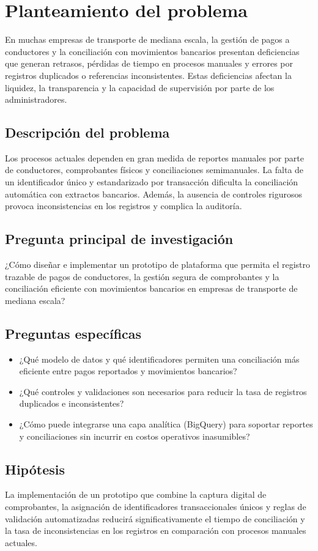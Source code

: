 \section{Planteamiento del problema}

En muchas empresas de transporte de mediana escala, la gestión de pagos a conductores y la conciliación con movimientos bancarios presentan deficiencias que generan retrasos, pérdidas de tiempo en procesos manuales y errores por registros duplicados o referencias inconsistentes. Estas deficiencias afectan la liquidez, la transparencia y la capacidad de supervisión por parte de los administradores.

\subsection{Descripción del problema}
Los procesos actuales dependen en gran medida de reportes manuales por parte de conductores, comprobantes físicos y conciliaciones semimanuales. La falta de un identificador único y estandarizado por transacción dificulta la conciliación automática con extractos bancarios. Además, la ausencia de controles rigurosos provoca inconsistencias en los registros y complica la auditoría.

\subsection{Pregunta principal de investigación}
¿Cómo diseñar e implementar un prototipo de plataforma que permita el registro trazable de pagos de conductores, la gestión segura de comprobantes y la conciliación eficiente con movimientos bancarios en empresas de transporte de mediana escala?

\subsection{Preguntas específicas}
\begin{itemize}
  \item ¿Qué modelo de datos y qué identificadores permiten una conciliación más eficiente entre pagos reportados y movimientos bancarios?
  \item ¿Qué controles y validaciones son necesarios para reducir la tasa de registros duplicados e inconsistentes?
  \item ¿Cómo puede integrarse una capa analítica (BigQuery) para soportar reportes y conciliaciones sin incurrir en costos operativos inasumibles?
\end{itemize}

\subsection{Hipótesis}
La implementación de un prototipo que combine la captura digital de comprobantes, la asignación de identificadores transaccionales únicos y reglas de validación automatizadas reducirá significativamente el tiempo de conciliación y la tasa de inconsistencias en los registros en comparación con procesos manuales actuales.